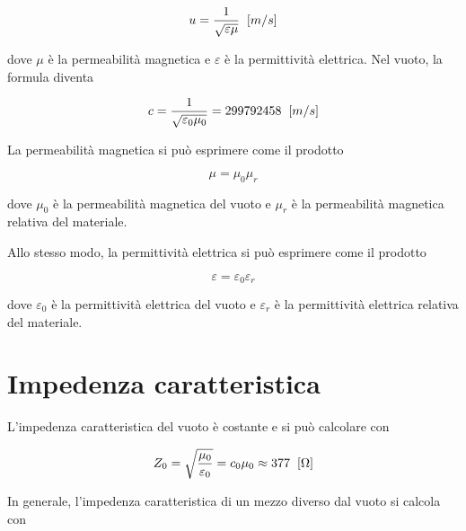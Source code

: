 \documentclass{article}
\begin{document}
    \begin{equation}
        u = \frac{1}{\sqrt{\varepsilon \mu}} \hspace{0.2cm} [m/s]
    \end{equation}

    dove $\mu$ è la permeabilità magnetica e $\varepsilon$ è la permittività elettrica.
    Nel vuoto, la formula diventa

    \begin{equation}
        c = \frac{1}{\sqrt{\varepsilon_0 \mu_0}} = 299 792 458 \hspace{0.2cm} [m/s]
    \end{equation}

    \vspace{1cm}

    La permeabilità magnetica si può esprimere come il prodotto

    \begin{equation}
        \mu = \mu_0 \mu_r
    \end{equation}

    dove $\mu_0$ è la permeabilità magnetica del vuoto e $\mu_r$ è la permeabilità magnetica relativa
    del materiale.

    \vspace{1cm}

    Allo stesso modo, la permittività elettrica si può esprimere come il prodotto

    \begin{equation}
        \varepsilon = \varepsilon_0 \varepsilon_r
    \end{equation}

    dove $\varepsilon_0$ è la permittività elettrica del vuoto e $\varepsilon_r$ è la permittività elettrica relativa
    del materiale.

    \section{Impedenza caratteristica}

    L'impedenza caratteristica del vuoto è costante e si può calcolare con

    \begin{equation}
        Z_0 = \sqrt{\frac{\mu_0}{\varepsilon_0}} = c_0 \mu_0 \approx 377 \hspace{0.2cm} [\Omega]
    \end{equation}

    In generale, l'impedenza caratteristica di un mezzo diverso dal vuoto si calcola con
\end{document}
